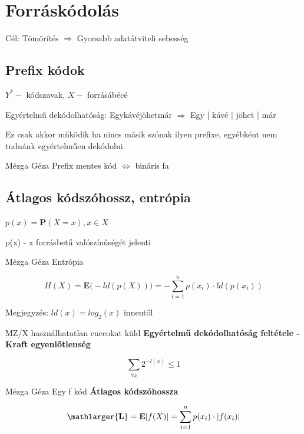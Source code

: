 
\section{Forráskódolás}
Cél: Tömörítés $\Longrightarrow$ Gyorsabb adatátviteli sebesség

\subsection{Prefix kódok}

$Y^* -$ kódszavak, $X -$ forrásábécé

Egyértelmű dekódolhatóság: Egykávéjöhetmár $\Longrightarrow$ Egy | kávé | jöhet | már

Ez csak akkor működik ha nincs másik szónak ilyen prefixe, egyébként nem tudnánk egyértelműen dekódolni.\\[-2pt]

\begin{definicio}{Mézga Géza} Prefix mentes kód $\Longleftrightarrow$ bináris fa\\[0pt]
\end{definicio}

\subsection{Átlagos kódszóhossz, entrópia}

$p(x) = \mathbf{P}(X = x), x \in X$

p(x) - x forrásbetű valószínűségét jelenti\\[-2pt]


\begin{definicio}{Mézga Géza} Entrópia

$$H(X) = \mathbf{E}\Big(-ld(p(X))\Big) = - \sum\limits_{i = 1}^n p(x_i)\cdot ld\left(p(x_i)\right)$$

\small Megjegyzés: $ld(x) = log_2(x)$ innentől \normalsize\\[2pt]
\end{definicio}

\begin{tetel}{MZ/X használhatatlan cuccokat küld}
\textbf{Egyértelmű dekódolhatóság feltétele - Kraft egyenlőtlenség}

$$ \sum\limits_{\forall x} 2^{-l(x)} \leq 1$$
\end{tetel}

\begin{definicio}{Mézga Géza} Egy f kód \textbf{Átlagos kódszóhossza}

$$ \mathlarger{\mathbf{L}} = \mathbf{E}|f(X)| = \sum\limits_{i = 1}^n p(x_i)\cdot |f(x_i)| $$
\end{definicio}

